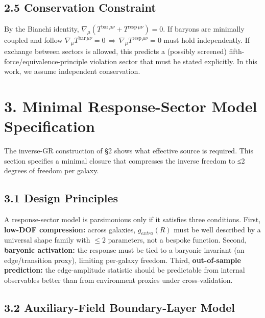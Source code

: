 \subsection{\texorpdfstring{2.5 Conservation Constraint }{2.5 Conservation Constraint }}\label{conservation-constraint}

By the Bianchi identity, \(\nabla_{\mu}\left( T^{\text{bar}\,\mu\nu} + T^{\text{resp}\,\mu\nu} \right) = 0\). If baryons are minimally coupled and follow \(\nabla_{\mu}T^{\text{bar}\,\mu\nu} = 0\, \Rightarrow \,\nabla_{\mu}T^{\text{resp}\,\mu\nu} = 0\) must hold independently. If exchange between sectors is allowed, this predicts a (possibly screened) fifth-force/equivalence-principle violation sector that must be stated explicitly. In this work, we assume independent conservation.

\section{}\label{section-4}

\section{3. Minimal Response-Sector Model Specification}\label{minimal-response-sector-model-specification}

The inverse-GR construction of §2 shows what effective source is required. This section specifies a minimal closure that compresses the inverse freedom to ≤2 degrees of freedom per galaxy.

\subsection{3.1 Design Principles}\label{design-principles}

A response-sector model is parsimonious only if it satisfies three conditions. First, \textbf{low-DOF compression:} across galaxies, \(g_{extra}(R)\) must be well described by a universal shape family with \(\leq 2\) parameters, not a bespoke function. Second, \textbf{baryonic activation:} the response must be tied to a baryonic invariant (an edge/transition proxy), limiting per-galaxy freedom. Third, \textbf{out-of-sample prediction:} the edge-amplitude statistic should be predictable from internal observables better than from environment proxies under cross-validation.

\subsection{3.2 Auxiliary-Field Boundary-Layer Model}\label{auxiliary-field-boundary-layer-model}


